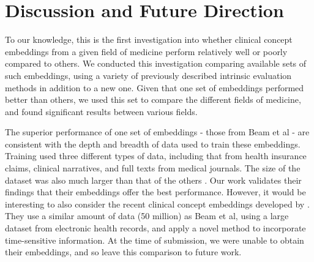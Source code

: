 \documentclass[11pt,a4paper]{article}
\def\blu#1{{\textbf{\color{blu}#1}}}
\def\ora#1{{\textbf{\color{ora}#1}}}
\begin{document}

\section{Discussion and Future Direction}
To our knowledge, this is the first investigation into whether clinical concept embeddings from a given field of medicine perform relatively well or poorly compared to others. We conducted this investigation comparing available sets of such embeddings, using a variety of previously described intrinsic evaluation methods in addition to a new one. Given that one set of embeddings performed better than others, we used this set to compare the different fields of medicine, and found significant results between various fields. 

The superior performance of one set of embeddings - those from Beam et al  - are consistent with the depth and breadth of data used to train these embeddings. Training used three different types of data, including that from health insurance claims, clinical narratives, and full texts from medical journals. The size of the dataset was also much larger than that of the others . Our work validates their findings that their embeddings offer the best performance. However, it would be interesting to also consider the recent clinical concept embeddings developed by \cite{xiangTimesensitiveClinicalConcept2019}. They use a similar amount of data (50 million) as Beam et al, using a large dataset from electronic health records, and apply a novel method to incorporate time-sensitive information. At the time of submission, we were unable to obtain their embeddings, and so leave this comparison to future work.
\end{document}
